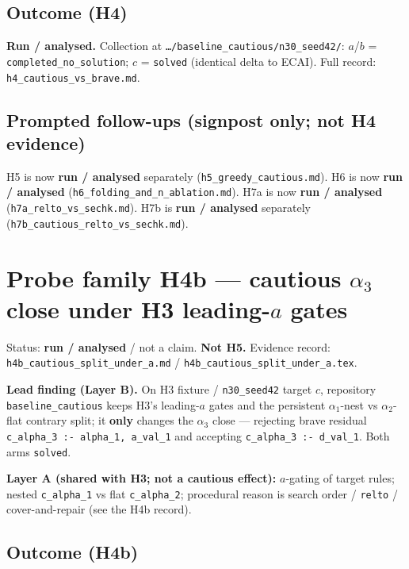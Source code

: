 \documentclass[11pt]{article}
\begin{document}
\subsection{Outcome (H4)}

\textbf{Run / analysed.}
Collection at \texttt{\ldots/baseline\_cautious/n30\_seed42/}: \(a\)/\(b\) =
\texttt{completed\_no\_solution}; \(c\) = \texttt{solved} (identical delta to
ECAI).
Full record: \texttt{h4\_cautious\_vs\_brave.md}.

\subsection{Prompted follow-ups (signpost only; not H4 evidence)}

H5 is now \textbf{run / analysed} separately (\texttt{h5\_greedy\_cautious.md}).
H6 is now \textbf{run / analysed} (\texttt{h6\_folding\_and\_n\_ablation.md}).
H7a is now \textbf{run / analysed} (\texttt{h7a\_relto\_vs\_sechk.md}).
H7b is \textbf{run / analysed} separately
(\texttt{h7b\_cautious\_relto\_vs\_sechk.md}).

\section{Probe family H4b --- cautious $\alpha_3$ close under H3 leading-$a$ gates}

Status: \textbf{run / analysed} / not a claim. \textbf{Not H5.}
Evidence record: \texttt{h4b\_cautious\_split\_under\_a.md} /
\texttt{h4b\_cautious\_split\_under\_a.tex}.

\textbf{Lead finding (Layer B).}
On H3 fixture  / \texttt{n30\_seed42}
target \(c\), repository \texttt{baseline\_cautious} keeps H3's leading-$a$
gates and the persistent $\alpha_1$-nest vs $\alpha_2$-flat contrary split;
it \textbf{only} changes the $\alpha_3$ close --- rejecting brave residual
\texttt{c\_alpha\_3 :- alpha\_1, a\_val\_1} and accepting
\texttt{c\_alpha\_3 :- d\_val\_1}.
Both arms \texttt{solved}.

\textbf{Layer A (shared with H3; not a cautious effect):}
$a$-gating of target rules; nested \texttt{c\_alpha\_1} vs flat
\texttt{c\_alpha\_2}; procedural reason is search order / \texttt{relto} /
cover-and-repair (see the H4b record).

\subsection{Outcome (H4b)}
\end{document}

